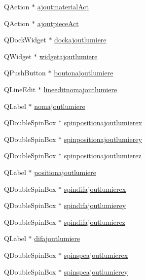 \begin{DoxyCompactItemize}
\item 
Q\+Action $\ast$ \hyperlink{class_main_window_ae531eca2b9941c7f260f466edd97790e}{ajoutmaterial\+Act}
\item 
Q\+Action $\ast$ \hyperlink{class_main_window_a150ff31dd92454823cf92bd6d4d1852d}{ajoutpiece\+Act}
\item 
Q\+Dock\+Widget $\ast$ \hyperlink{class_main_window_a391dd00592f215079a80db989f24266e}{dockajoutlumiere}
\item 
Q\+Widget $\ast$ \hyperlink{class_main_window_a9e2c8a96b09dbbfaa041531420603b9e}{widgetajoutlumiere}
\item 
Q\+Push\+Button $\ast$ \hyperlink{class_main_window_a4f7a42439a3d1dbc5213e5d2282f5ab0}{boutonajoutlumiere}
\item 
Q\+Line\+Edit $\ast$ \hyperlink{class_main_window_a88ef14a32e7bd0694d8c970b700588c8}{lineeditnomajoutlumiere}
\item 
Q\+Label $\ast$ \hyperlink{class_main_window_ad38c142eee23820d2d4c87217ea3558a}{nomajoutlumiere}
\item 
Q\+Double\+Spin\+Box $\ast$ \hyperlink{class_main_window_a5286af2240735027e43e96856889ba2d}{spinpositionajoutlumierex}
\item 
Q\+Double\+Spin\+Box $\ast$ \hyperlink{class_main_window_af8f989d61672591976f45a3857bd4088}{spinpositionajoutlumierey}
\item 
Q\+Double\+Spin\+Box $\ast$ \hyperlink{class_main_window_a190e482131a28865d5cb0956a1149272}{spinpositionajoutlumierez}
\item 
Q\+Label $\ast$ \hyperlink{class_main_window_a3c50fe103c1d0f1278737bced7e2e452}{positionajoutlumiere}
\item 
Q\+Double\+Spin\+Box $\ast$ \hyperlink{class_main_window_a0c740f449736ce6c303b0675f954f050}{spindifajoutlumierex}
\item 
Q\+Double\+Spin\+Box $\ast$ \hyperlink{class_main_window_ae03c85b751d4a28e2916e66d82d7e72d}{spindifajoutlumierey}
\item 
Q\+Double\+Spin\+Box $\ast$ \hyperlink{class_main_window_afca1245690133c96c9e182b0b56c6006}{spindifajoutlumierez}
\item 
Q\+Label $\ast$ \hyperlink{class_main_window_a87d3bd68a5f4e2323110804c4111dcc9}{difajoutlumiere}
\item 
Q\+Double\+Spin\+Box $\ast$ \hyperlink{class_main_window_a433afe9bb63e53ccf2253eb39ee6ebd1}{spinspeajoutlumierex}
\item 
Q\+Double\+Spin\+Box $\ast$ \hyperlink{class_main_window_afd72a5b29130fa092fdb6cb9b05f937c}{spinspeajoutlumierey}

\end{DoxyCompactItemize}
